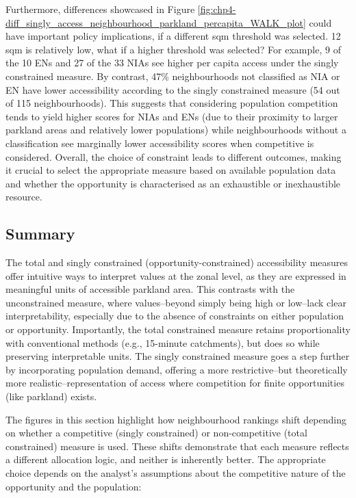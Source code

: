 \documentclass[
11pt, %
oneside, %
english, %
singlespacing, %
]{macthesis} %
\begin{document}
Furthermore, differences showcased in Figure \ref{fig:chp4-diff_singly_access_neighbourhood_parkland_percapita_WALK_plot} could have important policy implications, if a different sqm threshold was selected. 12 sqm is relatively low, what if a higher threshold was selected? For example, 9 of the 10 ENs and 27 of the 33 NIAs see higher per capita access under the singly constrained measure. By contrast, 47\% neighbourhoods not classified as NIA or EN have lower accessibility according to the singly constrained measure (54 out of 115 neighbourhoods). This suggests that considering population competition tends to yield higher scores for NIAs and ENs (due to their proximity to larger parkland areas and relatively lower populations) while neighbourhoods without a classification see marginally lower accessibility scores when competitive is considered. Overall, the choice of constraint leads to different outcomes, making it crucial to select the appropriate measure based on available population data and whether the opportunity is characterised as an exhaustible or inexhaustible resource.

\subsection{Summary}\label{summary}

The total and singly constrained (opportunity-constrained) accessibility measures offer intuitive ways to interpret values at the zonal level, as they are expressed in meaningful units of accessible parkland area. This contrasts with the unconstrained measure, where values--beyond simply being high or low--lack clear interpretability, especially due to the absence of constraints on either population or opportunity. Importantly, the total constrained measure retains proportionality with conventional methods (e.g., 15-minute catchments), but does so while preserving interpretable units. The singly constrained measure goes a step further by incorporating population demand, offering a more restrictive--but theoretically more realistic--representation of access where competition for finite opportunities (like parkland) exists.

The figures in this section highlight how neighbourhood rankings shift depending on whether a competitive (singly constrained) or non-competitive (total constrained) measure is used. These shifts demonstrate that each measure reflects a different allocation logic, and neither is inherently better. The appropriate choice depends on the analyst's assumptions about the competitive nature of the opportunity and the population:
\end{document}
